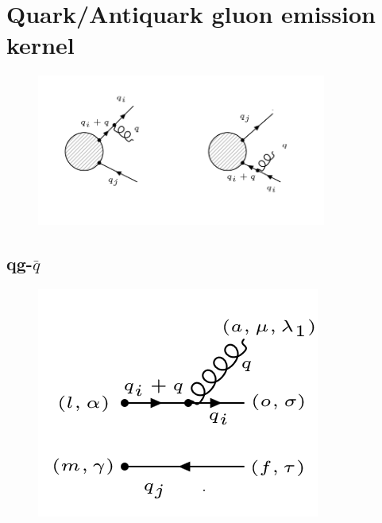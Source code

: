 \section{Quark/Antiquark gluon emission kernel}


\begin{figure}[ht!]
\centering
\includegraphics[width=0.85\textwidth]{images/qqg-diagrams.png}
\end{figure}

\subsection{qg-$\bar{q}$}

\begin{figure}[h!]
\centering
\includegraphics[scale=0.7]{images/qgqbarM.png}
\end{figure}

